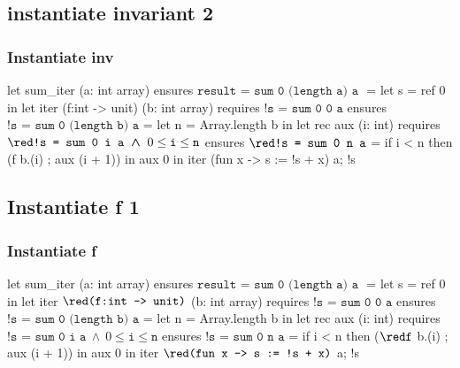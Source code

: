 \documentclass[xcolor=dvipsnames]{beamer}
\newcommand{\OliveGreen}[1]{\textcolor{OliveGreen}{#1}}
\newcommand{\bwedge}{\boldsymbol{~\wedge~}}
\begin{document}
\subsection*{instantiate invariant 2}
\begin{frame}[fragile]
\frametitle{\OliveGreen{Instantiate inv}}
\vspace*{0em}
\begin{footnotesize}
\begin{whycode}
let sum_iter (a: int array) 
ensures { $\texttt{result = sum 0 (length a) a }$}
= let s = ref 0 in 
  let iter (f:int -> unit) (b: int array)
  requires { ${ \texttt{!s = sum 0 0 a}}$ } 
  ensures  { ${ \texttt{!s = sum 0 (length b) a}}$ } 
  = let n = Array.length b in
    let rec aux (i: int)
    requires { ${\red\texttt{!s = sum 0 i a}\bwedge 0 \leq \texttt{i} \leq \texttt{n}}$ }
    ensures  { ${\red\texttt{!s = sum 0 n a}}$ }
    = if i < n
      then (f b.(i) ; aux (i + 1)) 
    in aux 0
  in iter (fun x -> s := !s + x) a; 
  !s
\end{whycode}
\end{footnotesize}
\end{frame}
\addtocounter{framenumber}{-1}



\subsection*{Instantiate f 1}
\begin{frame}[fragile]
\frametitle{\OliveGreen{Instantiate f}}
\vspace*{0em}
\begin{footnotesize}
\begin{whycode}
let sum_iter (a: int array) 
ensures { $\texttt{result = sum 0 (length a) a }$}
= let s = ref 0 in 
  let iter ${\red\texttt{(f:int -> unit)}}$ (b: int array)
  requires { ${ \texttt{!s = sum 0 0 a}}$ } 
  ensures  { ${ \texttt{!s = sum 0 (length b) a}}$ } 
  = let n = Array.length b in
    let rec aux (i: int)
    requires { ${\texttt{!s = sum 0 i a}\bwedge 0 \leq \texttt{i} \leq \texttt{n}}$ }
    ensures  { ${\texttt{!s = sum 0 n a}}$ }
    = if i < n
      then (${\red\texttt{f}}$ b.(i) ; aux (i + 1)) 
    in aux 0
  in iter ${\red\texttt{(fun x -> s := !s + x)}}$ a; 
  !s
\end{whycode}
\end{footnotesize}
\end{frame}
\addtocounter{framenumber}{-1}
\end{document}
